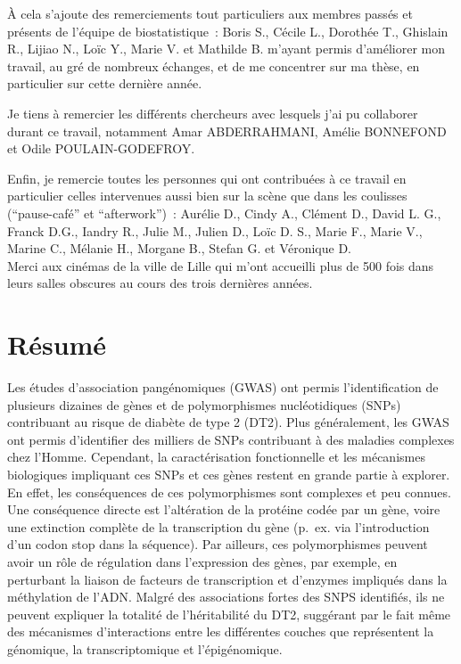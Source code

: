\documentclass[11pt,a4paper,notrimn]{krantz}
\theoremstyle{definition}
\theoremstyle{definition}
\theoremstyle{remark}
\begin{document}
À cela s'ajoute des remerciements tout particuliers aux membres passés
et présents de l'équipe de biostatistique~: Boris S., Cécile L.,
Dorothée T., Ghislain R., Lijiao N., Loïc Y., Marie V. et Mathilde B.
m'ayant permis d'améliorer mon travail, au gré de nombreux échanges, et
de me concentrer sur ma thèse, en particulier sur cette dernière année.

Je tiens à remercier les différents chercheurs avec lesquels j'ai pu
collaborer durant ce travail, notamment Amar ABDERRAHMANI, Amélie
BONNEFOND et Odile POULAIN-GODEFROY.

Enfin, je remercie toutes les personnes qui ont contribuées à ce travail
en particulier celles intervenues aussi bien sur la scène que dans les
coulisses (``pause-café'' et ``afterwork'')~: Aurélie D., Cindy A.,
Clément D., David L. G., Franck D.G., Iandry R., Julie M., Julien D.,
Loïc D. S., Marie F., Marie V., Marine C., Mélanie H., Morgane B.,
Stefan G. et Véronique D.\\
Merci aux cinémas de la ville de Lille qui m'ont accueilli plus de 500
fois dans leurs salles obscures au cours des trois dernières années.

\chapter*{Résumé}\label{resume}


\normalsize Les études d'association pangénomiques
(GWAS) ont permis l'identification de plusieurs dizaines de gènes et de
polymorphismes nucléotidiques (SNPs) contribuant au risque de diabète de
type 2 (DT2). Plus généralement, les GWAS ont permis d'identifier des
milliers de SNPs contribuant à des maladies complexes chez l'Homme.
Cependant, la caractérisation fonctionnelle et les mécanismes
biologiques impliquant ces SNPs et ces gènes restent en grande partie à
explorer. En effet, les conséquences de ces polymorphismes sont
complexes et peu connues. Une conséquence directe est l'altération de la
protéine codée par un gène, voire une extinction complète de la
transcription du gène (p.~ex. via l'introduction d'un codon stop dans la
séquence). Par ailleurs, ces polymorphismes peuvent avoir un rôle de
régulation dans l'expression des gènes, par exemple, en perturbant la
liaison de facteurs de transcription et d'enzymes impliqués dans la
méthylation de l'ADN. Malgré des associations fortes des SNPS
identifiés, ils ne peuvent expliquer la totalité de l'héritabilité du
DT2, suggérant par le fait même des mécanismes d'interactions entre les
différentes couches que représentent la génomique, la transcriptomique
et l'épigénomique.
\end{document}
